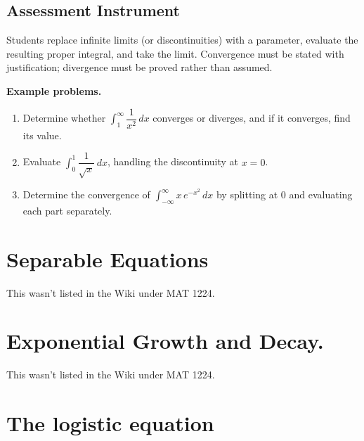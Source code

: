 \subsection{Assessment Instrument}
\label{ssec:impr-a882}

Students replace infinite limits (or discontinuities) with a parameter, evaluate the resulting proper integral, and take the limit. Convergence must be stated with justification; divergence must be proved rather than assumed.

\textbf{Example problems.}

\begin{enumerate}
    \item Determine whether $\int_1^{\infty}\dfrac{1}{x^2}\,dx$ converges or diverges, and if it converges, find its value.
    \item Evaluate $\int_0^1\dfrac{1}{\sqrt{x}}\,dx$, handling the discontinuity at $x=0$.
    \item Determine the convergence of $\int_{-\infty}^{\infty}x\,e^{-x^2}\,dx$ by splitting at $0$ and evaluating each part separately.
\end{enumerate}

\section{Separable Equations}
\label{sec:separable-equations}

This wasn't listed in the Wiki under MAT 1224.

\section{Exponential Growth and Decay.}
\label{sec:expo-fa23}

This wasn't listed in the Wiki under MAT 1224.

\section{The logistic equation}
\label{sec:thel-e63c}

